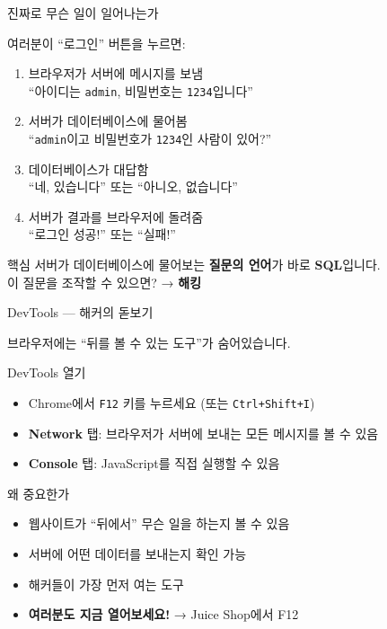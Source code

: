 \documentclass[aspectratio=169,10pt]{beamer}
\newcommand{\hlt}[1]{\textcolor{accent}{\textbf{#1}}}
\begin{document}
\begin{frame}{진짜로 무슨 일이 일어나는가}

여러분이 ``로그인'' 버튼을 누르면:

\vspace{0.5em}
\begin{enumerate}
    \item 브라우저가 서버에 메시지를 보냄 \\
          {\footnotesize ``아이디는 \texttt{admin}, 비밀번호는 \texttt{1234}입니다''}
    \item 서버가 데이터베이스에 물어봄 \\
          {\footnotesize ``\texttt{admin}이고 비밀번호가 \texttt{1234}인 사람이 있어?''}
    \item 데이터베이스가 대답함 \\
          {\footnotesize ``네, 있습니다'' 또는 ``아니오, 없습니다''}
    \item 서버가 결과를 브라우저에 돌려줌 \\
          {\footnotesize ``로그인 성공!'' 또는 ``실패!''}
\end{enumerate}

\vspace{0.5em}
\begin{alertblock}{핵심}
서버가 데이터베이스에 물어보는 \hlt{질문의 언어}가 바로 \textbf{SQL}입니다.\\
이 질문을 조작할 수 있으면? → \hlt{해킹}
\end{alertblock}
\end{frame}

\begin{frame}{DevTools — 해커의 돋보기}

브라우저에는 ``뒤를 볼 수 있는 도구''가 숨어있습니다.

\vspace{0.5em}
\begin{block}{DevTools 열기}
\begin{itemize}
    \item Chrome에서 \texttt{F12} 키를 누르세요 (또는 \texttt{Ctrl+Shift+I})
    \item \textbf{Network} 탭: 브라우저가 서버에 보내는 모든 메시지를 볼 수 있음
    \item \textbf{Console} 탭: JavaScript를 직접 실행할 수 있음
\end{itemize}
\end{block}

\vspace{0.5em}
\begin{block}{왜 중요한가}
\begin{itemize}
    \item 웹사이트가 ``뒤에서'' 무슨 일을 하는지 볼 수 있음
    \item 서버에 어떤 데이터를 보내는지 확인 가능
    \item 해커들이 가장 먼저 여는 도구
    \item \hlt{여러분도 지금 열어보세요!} → Juice Shop에서 F12
\end{itemize}
\end{block}
\end{frame}
\end{document}
